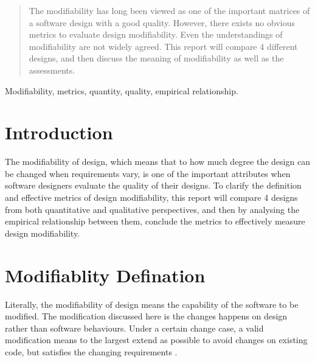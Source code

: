 \documentclass[conference]{IEEEtran}
\begin{document}
	
	
	
	\maketitle
	
	\begin{abstract}
	The modifiability has long been viewed as one of the important matrices of a software design with a good quality. However, there exists no obvious metrics to evaluate design modifiability. Even the understandings of modifiability are not widely agreed. This report will compare 4 different designs, and then discuss the meaning of modifiability as well as the assessments.  
	\end{abstract}
	
	\begin{IEEEkeywords}
	Modifiability, metrics, quantity, quality, empirical relationship.
	\end{IEEEkeywords}
	
	
	
	
	\IEEEpeerreviewmaketitle
	
	
	
	\section{Introduction}
	The modifiability of design, which means that to how much degree the design can be changed when requirements vary, is one of the important attributes when software designers evaluate the quality of their designs. To clarify the definition and effective metrics of design modifiability, this report will compare 4 designs from both quantitative and qualitative perspectives, and then by analysing the empirical relationship between them, conclude the metrics to effectively measure design modifiability.
	
	\section{Modifiablity Defination}
	Literally, the modifiability of design means the capability of the software to be modified. The modification discussed here is the changes happens on design rather than software behaviours. Under a certain change case, a valid modification means to the largest extend as possible to avoid changes on existing code, but satisfies the changing requirements \cite{2}.
	
\end{document}
